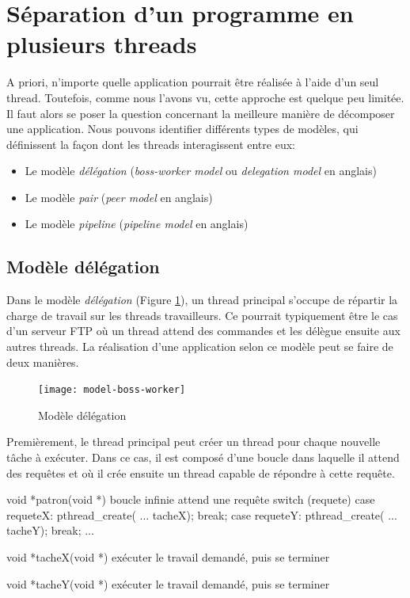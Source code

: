 \section{Séparation d'un programme en plusieurs threads}

A priori, n'importe quelle application pourrait être réalisée à l'aide d'un seul thread. Toutefois, comme nous l'avons vu, cette approche est quelque peu limitée. Il faut alors se poser la question concernant la meilleure manière de décomposer une application. Nous pouvons identifier différents types de modèles, qui définissent la façon dont les threads interagissent entre eux:

\begin{itemize}
  \item Le modèle \emph{délégation} (\emph{boss-worker model} ou \emph{delegation model} en anglais)
  \item Le modèle \emph{pair} (\emph{peer model} en anglais)
  \item Le modèle \emph{pipeline} (\emph{pipeline model} en anglais)
\end{itemize}

\subsection{Modèle délégation}

Dans le modèle \emph{délégation} (Figure \ref{fig:model-boss-worker}), un thread principal s'occupe de répartir la charge de travail sur les threads travailleurs. Ce pourrait typiquement être le cas d'un serveur FTP où un thread attend des commandes et les délègue ensuite aux autres threads. La réalisation d'une application selon ce modèle peut se faire de deux manières.


\begin{figure}[ht]
  \begin{center}
    \texttt{[image: model-boss-worker]}
    \caption{\label{fig:model-boss-worker}Modèle délégation}
  \end{center}
\end{figure}

Premièrement, le thread principal peut créer un thread pour chaque nouvelle tâche à exécuter. Dans ce cas, il est composé d'une boucle dans laquelle il attend des requêtes et où il crée ensuite un thread capable de répondre à cette requête.

\newpage

\begin{codeblock}[list text={Exemple Patron},title={Exemple}]
void *patron(void *) {
  boucle infinie {
    attend une requête
    switch (requete) {
      case requeteX: pthread_create( ... tacheX); break;
      case requeteY: pthread_create( ... tacheY); break;
      ...
    }
  }
}

void *tacheX(void *) {
  exécuter le travail demandé, puis se terminer
}

void *tacheY(void *) {
  exécuter le travail demandé, puis se terminer
}
\end{codeblock}

